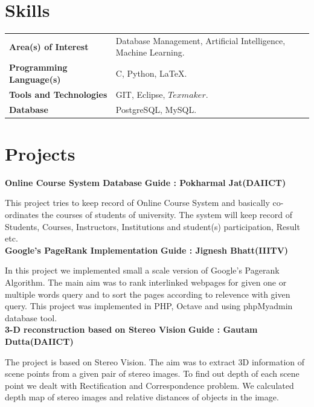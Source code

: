 \documentclass{article}
\begin{document}
\vspace*{.4cm}
\section{Skills}
\begin{tabular}{ll}
\textbf{Area(s) of Interest} &Database Management, Artificial Intelligence, Machine Learning.\\
\textbf{Programming Language(s)}&C, Python, \LaTeX.\\
\textbf{Tools and Technologies} & GIT, Eclipse, $Texmaker$. \\
\textbf{Database} & PostgreSQL, MySQL.\\
\end{tabular}

\vspace*{.5cm}
\section{Projects}
\textbf{\large{Online Course System Database}} \hspace*{6cm} \textbf{Guide : Pokharmal Jat(DAIICT)}

\vspace*{.051mm}
\hspace*{2.6mm} This project tries to keep record of Online Course System and basically co-ordinates the courses of students of university. The system will keep record of Students, Courses, Instructors, Institutions and student(s) participation, Result etc.\\

\textbf{\large{Google's PageRank Implementation}} \hspace*{6cm} \textbf{Guide : Jignesh Bhatt(IIITV)}

\vspace*{.051mm}
\hspace*{2.6mm} In this project we implemented small a scale version of Google's Pagerank Algorithm. The main aim was to rank interlinked webpages for given one or multiple words query and to sort the pages according to relevence with given query. This project was implemented in PHP, Octave and using phpMyadmin database tool.\\

\textbf{\large{3-D reconstruction based on Stereo Vision}} \hspace*{3.6cm} \textbf{Guide : Gautam Dutta(DAIICT)}

\vspace*{.051mm}
\hspace*{2.6mm} The project is based on Stereo Vision. The aim was to extract 3D information of scene points from a given pair of stereo images. To find out depth of each scene point we dealt with Rectification and Correspondence problem. We calculated depth map of stereo images and relative distances of objects in the image.
\end{document}
